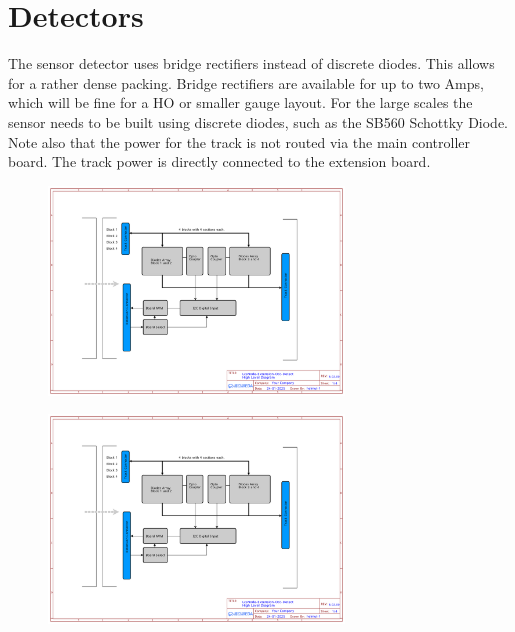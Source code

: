 \section{Detectors}

The sensor detector uses bridge rectifiers instead of discrete diodes. This allows for a rather dense packing. Bridge rectifiers are available for up to two Amps, which will be fine for a HO or smaller gauge layout. For the large scales the sensor needs to be built using discrete diodes, such as the SB560 Schottky Diode. Note also that the power for the track is not routed via the main controller board. The track power is directly connected to the extension board.

\begin{figure}[htbp]
    \centering
    \includegraphics[page=3, width=0.7\textwidth]{./Schematics/Schematic_LcsNodes-Extension-Occ-Detect.pdf}
\end{figure}
\FloatBarrier

\begin{figure}[htbp]
    \centering
    \includegraphics[page=4, width=0.7\textwidth]{./Schematics/Schematic_LcsNodes-Extension-Occ-Detect.pdf}
\end{figure}
\FloatBarrier

